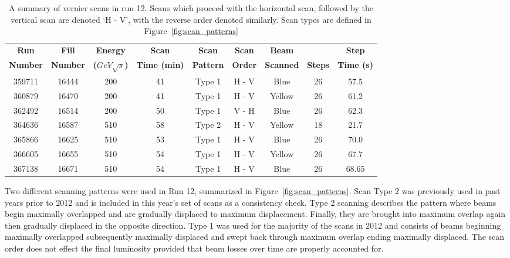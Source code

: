\begin{table}
  \centering
  \begin{tabular}{ccccccccc}
    \toprule
    \textbf{Run} & 
    \textbf{Fill} & 
    \textbf{Energy} & 
    \textbf{Scan} & 
    \textbf{Scan} & 
    \textbf{Scan} & 
    \textbf{Beam} & & 
    \textbf{Step} \\
    \textbf{Number} & 
    \textbf{Number} & 
    \textbf{($GeV\sqrt{s}$)} & 
    \textbf{Time (min)} & 
    \textbf{Pattern} & 
    \textbf{Order} & 
    \textbf{Scanned} & 
    \textbf{Steps} & 
    \textbf{Time (s)} \\
    \midrule
    359711 & 16444 & 200 & 41 & Type 1 & H - V & Blue  & 26 & 57.5 \\
    360879 & 16470 & 200 & 41 & Type 1 & H - V & Yellow& 26 & 61.2 \\
    362492 & 16514 & 200 & 50 & Type 1 & V - H & Blue  & 26 & 62.3 \\
    364636 & 16587 & 510 & 58 & Type 2 & H - V & Yellow& 18 & 21.7 \\
    365866 & 16625 & 510 & 53 & Type 1 & H - V & Blue  & 26 & 70.0 \\
    366605 & 16655 & 510 & 54 & Type 1 & H - V & Yellow& 26 & 67.7 \\
    367138 & 16671 & 510 & 54 & Type 1 & H - V & Blue  & 26 & 68.65\\
    \bottomrule
  \end{tabular}
  \caption{ 
    A summary of vernier scans in run 12. Scans which proceed with the
    horizontal scan, followed by the vertical scan are denoted `H - V', with the
    reverse order denoted similarly. Scan types are defined in
    Figure~\ref{fig:scan_patterns}
  }
  \label{tab:global_scan_summary}
\end{table}

Two different scanning patterns were used in Run 12, summarized in
Figure~\ref{fig:scan_patterns}. Scan Type 2 was previously used in past years
prior to 2012 and is included in this year's set of scans as a consistency
check. Type 2 scanning describes the pattern where beams begin maximally
overlapped and are gradually displaced to maximum displacement. Finally, they
are brought into maximum overlap again then gradually displaced in the opposite
direction.  Type 1 was used for the majority of the scans in 2012 and consists
of beams beginning maximally overlapped subsequently maximally displaced and
swept back through maximum overlap ending maximally displaced. The scan
order does not effect the final luminosity provided that beam losses over time
are properly accounted for.

